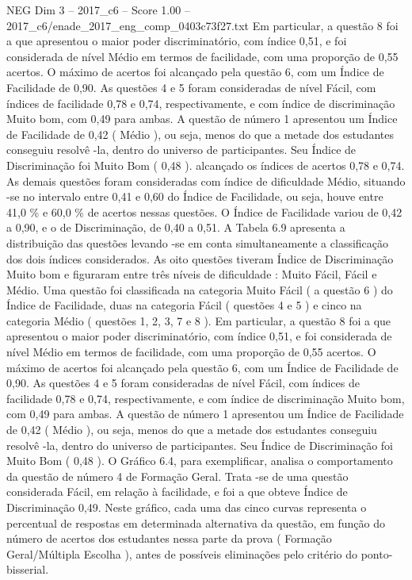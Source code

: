 \begin{textsample}{NEG Dim 3 – 2017\_c6 – Score 1.00 – 2017\_c6/enade\_2017\_eng\_comp\_0403c73f27.txt}
Em particular, a questão 8 foi a que apresentou o maior poder discriminatório, com índice 0,51, e foi considerada de nível Médio em termos de facilidade, com uma proporção de 0,55 acertos.
O máximo de acertos foi alcançado pela questão 6, com um Índice de Facilidade de 0,90.
As questões 4 e 5 foram consideradas de nível Fácil, com índices de facilidade 0,78 e 0,74, respectivamente, e com índice de discriminação Muito bom, com 0,49 para ambas.
A questão de número 1 apresentou um Índice de Facilidade de 0,42 ( Médio ), ou seja, menos do que a metade dos estudantes conseguiu resolvê -la, dentro do universo de participantes.
Seu Índice de Discriminação foi Muito Bom ( 0,48 ). alcançado os índices de acertos 0,78 e 0,74.
As demais questões foram consideradas com índice de dificuldade Médio, situando -se no intervalo entre 0,41 e 0,60 do Índice de Facilidade, ou seja, houve entre 41,0 \% e 60,0 \% de acertos nessas questões.
O Índice de Facilidade variou de 0,42 a 0,90, e o de Discriminação, de 0,40 a 0,51.
A Tabela 6.9 apresenta a distribuição das questões levando -se em conta simultaneamente a classificação dos dois índices considerados.
As oito questões tiveram Índice de Discriminação Muito bom e figuraram entre três níveis de dificuldade : Muito Fácil, Fácil e Médio.
Uma questão foi classificada na categoria Muito Fácil ( a questão 6 ) do Índice de Facilidade, duas na categoria Fácil ( questões 4 e 5 ) e cinco na categoria Médio ( questões 1, 2, 3, 7 e 8 ).
Em particular, a questão 8 foi a que apresentou o maior poder discriminatório, com índice 0,51, e foi considerada de nível Médio em termos de facilidade, com uma proporção de 0,55 acertos.
O máximo de acertos foi alcançado pela questão 6, com um Índice de Facilidade de 0,90.
As questões 4 e 5 foram consideradas de nível Fácil, com índices de facilidade 0,78 e 0,74, respectivamente, e com índice de discriminação Muito bom, com 0,49 para ambas.
A questão de número 1 apresentou um Índice de Facilidade de 0,42 ( Médio ), ou seja, menos do que a metade dos estudantes conseguiu resolvê -la, dentro do universo de participantes.
Seu Índice de Discriminação foi Muito Bom ( 0,48 ).
O Gráfico 6.4, para exemplificar, analisa o comportamento da questão de número 4 de Formação Geral.
Trata -se de uma questão considerada Fácil, em relação à facilidade, e foi a que obteve Índice de Discriminação 0,49.
Neste gráfico, cada uma das cinco curvas representa o percentual de respostas em determinada alternativa da questão, em função do número de acertos dos estudantes nessa parte da prova ( Formação Geral/Múltipla Escolha ), antes de possíveis eliminações pelo critério do ponto-bisserial.

\end{textsample}
